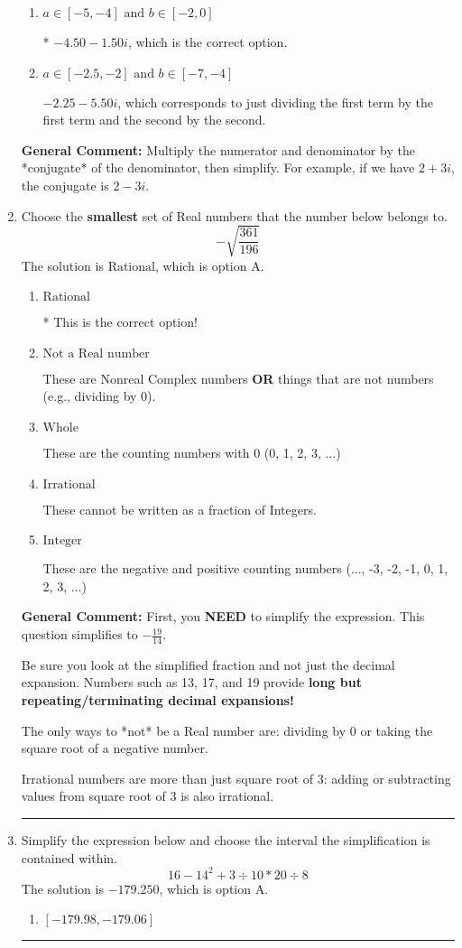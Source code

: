 \documentclass{extbook}[14pt]
\newcommand{\litem}[1]{\item #1

\rule{\textwidth}{0.4pt}}
\begin{document}
\begin{enumerate}
{\begin{enumerate}[label=\Alph*.]
 $-4.50  - 78.00 i$, which corresponds to forgetting to multiply the conjugate by the numerator.
\item \( a \in [-5, -4] \text{ and } b \in [-2, 0] \)

* $-4.50  - 1.50 i$, which is the correct option.
\item \( a \in [-2.5, -2] \text{ and } b \in [-7, -4] \)

 $-2.25  - 5.50 i$, which corresponds to just dividing the first term by the first term and the second by the second.
\end{enumerate}

\textbf{General Comment:} Multiply the numerator and denominator by the *conjugate* of the denominator, then simplify. For example, if we have $2+3i$, the conjugate is $2-3i$.
}
\litem{
Choose the \textbf{smallest} set of Real numbers that the number below belongs to.
\[ -\sqrt{\frac{361}{196}} \]The solution is \( \text{Rational} \), which is option A.\begin{enumerate}[label=\Alph*.]
\item \( \text{Rational} \)

* This is the correct option!
\item \( \text{Not a Real number} \)

These are Nonreal Complex numbers \textbf{OR} things that are not numbers (e.g., dividing by 0).
\item \( \text{Whole} \)

These are the counting numbers with 0 (0, 1, 2, 3, ...)
\item \( \text{Irrational} \)

These cannot be written as a fraction of Integers.
\item \( \text{Integer} \)

These are the negative and positive counting numbers (..., -3, -2, -1, 0, 1, 2, 3, ...)
\end{enumerate}

\textbf{General Comment:} First, you \textbf{NEED} to simplify the expression. This question simplifies to $-\frac{19}{14}$. 
 
 Be sure you look at the simplified fraction and not just the decimal expansion. Numbers such as 13, 17, and 19 provide \textbf{long but repeating/terminating decimal expansions!} 
 
 The only ways to *not* be a Real number are: dividing by 0 or taking the square root of a negative number. 
 
 Irrational numbers are more than just square root of 3: adding or subtracting values from square root of 3 is also irrational.
}
\litem{
Simplify the expression below and choose the interval the simplification is contained within.
\[ 16 - 14^2 + 3 \div 10 * 20 \div 8 \]The solution is \( -179.250 \), which is option A.\begin{enumerate}[label=\Alph*.]
\item \( [-179.98, -179.06] \)


\end{enumerate}}
\end{enumerate}
\end{document}
